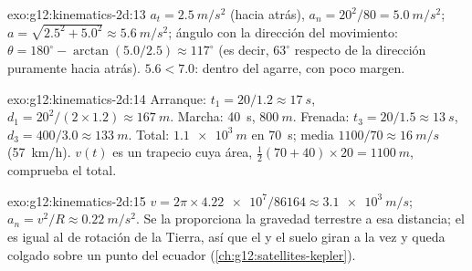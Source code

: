 \begin{solution}{exo:g12:kinematics-2d:13}
$a_t = \qty{2.5}{m/s^2}$ (hacia atrás),
$a_n = 20^2/80 = \qty{5.0}{m/s^2}$;
$a = \sqrt{2.5^2 + 5.0^2} \approx \qty{5.6}{m/s^2}$; ángulo con la
dirección del movimiento:
$\theta = 180^\circ - \arctan(5.0/2.5) \approx 117^\circ$ (es decir,
$63^\circ$ respecto de la dirección puramente hacia atrás).
$5.6 < 7.0$: dentro del agarre, con poco margen.
\end{solution}

\begin{solution}{exo:g12:kinematics-2d:14}
Arranque: $t_1 = 20/1.2 \approx \qty{17}{s}$,
$d_1 = 20^2/(2 \times 1.2) \approx \qty{167}{m}$. Marcha:
\qty{40}{s}, $\qty{800}{m}$. Frenada:
$t_3 = 20/1.5 \approx \qty{13}{s}$,
$d_3 = 400/3.0 \approx \qty{133}{m}$. Total: $\qty{1.1e3}{m}$ en
\qty{70}{s}; media $1100/70 \approx \qty{16}{m/s}$ (\qty{57}{km/h}).
$v(t)$ es un trapecio cuya área,
$\tfrac12(70 + 40) \times 20 = \qty{1100}{m}$, comprueba el total.
\end{solution}

\begin{solution}{exo:g12:kinematics-2d:15}
$v = 2\pi \times \num{4.22e7}/\num{86164} \approx \qty{3.1e3}{m/s}$;
$a_n = v^2/R \approx \qty{0.22}{m/s^2}$. Se la proporciona la gravedad
terrestre a esa distancia; el  es igual al  de rotación de
la Tierra, así que el  y el suelo giran a la vez y queda colgado
sobre un punto del ecuador (\cref{ch:g12:satellites-kepler}).
\end{solution}

